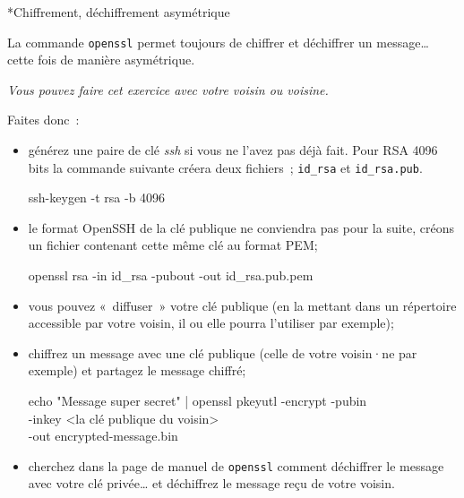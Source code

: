 \documentclass[a4paper,11pt]{article}
\begin{document}
\begin{Exercice}*{Chiffrement, déchiffrement asymétrique}
	
	La commande \texttt{openssl} permet toujours de chiffrer et déchiffrer un 
	message… cette fois de manière asymétrique. 

	\textit{Vous pouvez faire cet exercice avec votre voisin ou voisine.}

	
	Faites donc~:

	\begin{itemize}
		
		\item générez une paire de clé \textit{ssh} si vous ne l'avez pas déjà
			fait. Pour RSA 4096 bits la commande suivante créera deux fichiers~;
			\texttt{id\_rsa} et \texttt{id\_rsa.pub}.

			\begin{term}
				ssh-keygen -t rsa -b 4096
			\end{term}

		\item le format OpenSSH de la clé publique ne conviendra pas pour la suite,
			créons un fichier contenant cette même clé au format PEM;

			\begin{term}
				openssl rsa -in id\_rsa -pubout -out id\_rsa.pub.pem
			\end{term}

		\item vous pouvez «~diffuser~» votre clé publique  (en la mettant dans 
			un répertoire accessible par votre voisin, il ou elle pourra 
			l'utiliser par exemple); 

		\item chiffrez un message avec une clé publique (celle de votre voisin·ne
			par exemple) et partagez le message chiffré;

			\begin{term}
				echo "Message super secret" 
					| openssl pkeyutl -encrypt -pubin \ \\
						-inkey <la clé publique du voisin> \ \\
						-out encrypted-message.bin
			\end{term}

		\item cherchez dans la page de manuel de \texttt{openssl} comment 
			déchiffrer le message avec votre clé privée… et déchiffrez le 
			message reçu de votre voisin. 

	\end{itemize}

\end{Exercice}
\end{document}
